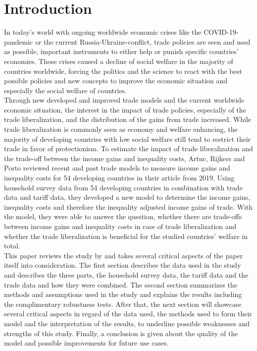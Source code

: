 \section{Introduction}
In today's world with ongoing worldwide economic crises like the COVID-19-pandemic or the current Russia-Ukraine-conflict,
trade policies are seen and used as possible, important instruments to either help or punish specific countries' economies. 
Those crises caused a decline of social welfare in the majority of countries worldwide, forcing the politics and the science
to react with the best possible policies and new concepts to improve the economic situation and especially the social welfare
of countries.\\

Through new developed and improved trade models and the current worldwide economic situation, the interest 
in the impact of trade policies, especially of the trade liberalization, and the distribution of the gains from trade increased. 
While trade liberalization is commonly seen as economy and welfare enhancing, the majority of developing countries with low social welfare
still tend to restrict their trade in favor of protectionism. To estimate the impact of trade liberalization and the trade-off
between the income gains and inequality costs, Artuc, Rijkers and Porto reviewed recent and past trade models to measure 
income gains and inequality costs for 54 developing countries in their article from 2019. Using household survey data from 54
developing countries in combination with trade data and tariff data, they developed a new model to determine the income gains,
inequality costs and therefore the inequality adjusted income gains of trade. With the model, they were able to answer the
question, whether there are trade-offs between income gains and inequality costs in case of trade liberalization and whether
the trade liberalization is beneficial for the studied countries' welfare in total.\\

This paper reviews the study by \cite{Artuc.2019} and takes several critical aspects of the paper itself into consideration.
The first section describes the data used in the study and describes the three parts, the household survey data, the tariff data
and the trade data and how they were combined. The second section summarizes the methods and assumptions used in the study and 
explains the results including the complimentary robustness tests.
After that, the next section will showcase several critical aspects in regard of the data used, 
the methods used to form their model and the interpretation of the results, to underline possible weaknesses and strengths of this study. 
Finally, a conclusion is given about the quality of the model and possible improvements for future use cases.